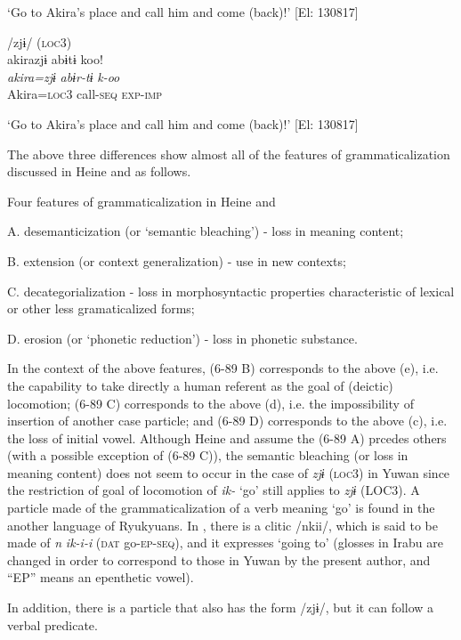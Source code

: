 \begin{table}
       [Intended meaning] ‘Go to Akira’s place and call him and come (back)!’ [El: 130817]

\ex /zjɨ/ (\textsc{loc}3)\\
{\TM}
\glll  akirazjɨ  abɨtɨ  koo!\\
\textit{akira=zjɨ}  \textit{abɨr-tɨ}  \textit{k-oo}\\
Akira=\textsc{loc}3  call-\textsc{seq}  \textsc{exp}-\textsc{imp}

 \glt ‘Go to Akira’s place and call him and come (back)!’ [El: 130817]

The above three differences show almost all of the features of grammaticalization discussed in Heine and \citet[2]{Kuteva2002} as follows.

\ea\label{ex:6-89}
 Four features of grammaticalization in Heine and \citet[2]{Kuteva2002}

A.  desemanticization (or ‘semantic bleaching’) - loss in meaning content;

B.  extension (or context generalization) - use in new contexts;

C.    decategorialization - loss in morphosyntactic properties characteristic of lexical or other less gramaticalized forms;

D.  erosion (or ‘phonetic reduction’) - loss in phonetic substance.
\z

In the context of the above features, (6-89 B) corresponds to the above (e), i.e. the capability to take directly a human referent as the goal of (deictic) locomotion; (6-89 C) corresponds to the above (d), i.e. the impossibility of insertion of another case particle; and (6-89 D) corresponds to the above (c), i.e. the loss of initial vowel. Although Heine and \citet[3]{Kuteva2002} assume the (6-89 A) prcedes others (with a possible exception of (6-89 C)), the semantic bleaching (or loss in meaning content) does not seem to occur in the case of \textit{zjɨ} (\textsc{loc}3) in Yuwan since the restriction of goal of locomotion of \textit{ik-} ‘go’ still applies to \textit{zjɨ} (LOC3). A particle made of the grammaticalization of a verb meaning ‘go’ is found in the another language of Ryukyuans. In \citet[207]{Shimoji2008}, there is a clitic /nkii/, which is said to be made of \textit{n} \textit{ik-i-i} (\textsc{dat} go-\textsc{ep}-\textsc{seq}), and it expresses ‘going to’ (glosses in Irabu are changed in order to correspond to those in Yuwan by the present author, and “EP” means an epenthetic vowel).

  In addition, there is a particle that also has the form /zjɨ/, but it can follow a verbal predicate.


\end{table}
